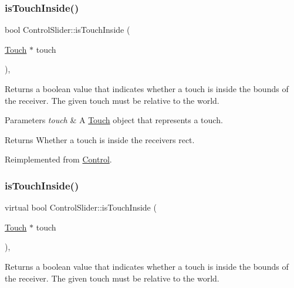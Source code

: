 \subsubsection{\texorpdfstring{is\+Touch\+Inside()}{isTouchInside()}\hspace{0.1cm}{\footnotesize\ttfamily [1/2]}}
{\footnotesize\ttfamily bool Control\+Slider\+::is\+Touch\+Inside (\begin{DoxyParamCaption}\item[{\hyperlink{classTouch}{Touch} $\ast$}]{touch }\end{DoxyParamCaption})\hspace{0.3cm}{\ttfamily [override]}, {\ttfamily [virtual]}}

Returns a boolean value that indicates whether a touch is inside the bounds of the receiver. The given touch must be relative to the world.


\begin{DoxyParams}{Parameters}
{\em touch} & A \hyperlink{classTouch}{Touch} object that represents a touch.\\
\hline
\end{DoxyParams}
\begin{DoxyReturn}{Returns}
Whether a touch is inside the receiver\textquotesingle{}s rect. 
\end{DoxyReturn}


Reimplemented from \hyperlink{classControl_a897865e3e4ff50ed827f33966e786c7f}{Control}.

\mbox{\label{classControlSlider_adb6f9deedd5830443e3560db6ab21020}} 
\subsubsection{\texorpdfstring{is\+Touch\+Inside()}{isTouchInside()}\hspace{0.1cm}{\footnotesize\ttfamily [2/2]}}
{\footnotesize\ttfamily virtual bool Control\+Slider\+::is\+Touch\+Inside (\begin{DoxyParamCaption}\item[{\hyperlink{classTouch}{Touch} $\ast$}]{touch }\end{DoxyParamCaption})\hspace{0.3cm}{\ttfamily [override]}, {\ttfamily [virtual]}}

Returns a boolean value that indicates whether a touch is inside the bounds of the receiver. The given touch must be relative to the world.


